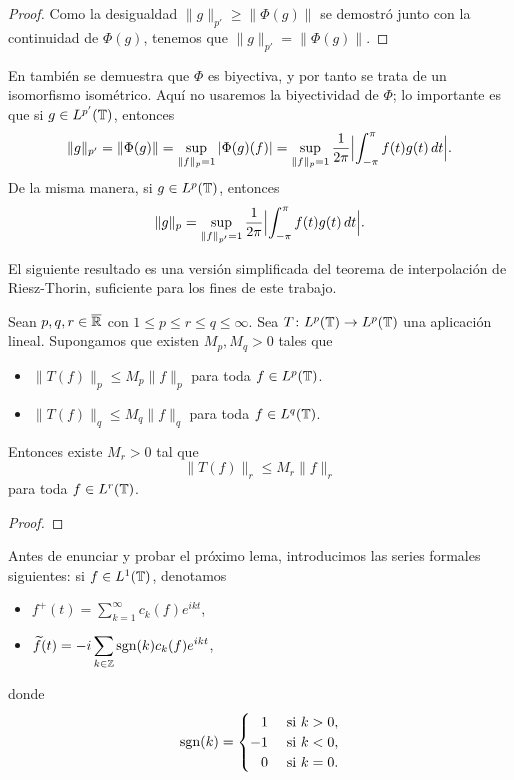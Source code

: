 \documentclass[a4paper, 12pt, oneside]{book}
\begin{document}
\begin{proof}
    Como la desigualdad $\|g\|_{p'} \geq \|\Phi(g)\|$ se demostró junto con la continuidad de $\Phi(g)$, tenemos que $\|g\|_{p'} = \|\Phi(g)\|$.
\end{proof}

En \cite{folland} también se demuestra que $\Phi$ es biyectiva, y por tanto se trata de un isomorfismo isométrico. Aquí no usaremos la biyectividad de $\Phi$; lo importante es que si $g \in L^{p'}(\mathbb T)$, entonces
\[
    \|g\|_{p'} = \|\Phi(g)\| = \sup_{\|f\|_p = 1} |\Phi(g)(f)| = \sup_{\|f\|_p=1}\frac{1}{2\pi}\Bigl|\int_{-\pi}^{\pi} f(t)g(t) \, dt\Bigr|.
\]
De la misma manera, si $g\in L^p(\mathbb T)$, entonces
\begin{equation}\label{1.3.1}
    \|g\|_{p} = \sup_{\|f\|_{p'}=1}\frac{1}{2\pi}\Bigl|\int_{-\pi}^{\pi} f(t)g(t) \, dt\Bigr|.
\end{equation}

El siguiente resultado es una versión simplificada del teorema de interpolación de Riesz-Thorin, suficiente para los fines de este trabajo.

\begin{theorem}\label{3.2.2}
    Sean $p,q,r\in\overline{\mathbb R}$ con $1 \leq p \leq r \leq q \leq \infty$. Sea $T \colon L^{p}(\mathbb T) \to L^{p}(\mathbb T)$ una aplicación lineal. Supongamos que existen $M_p,M_q>0$ tales que
    \begin{itemize}
        \item $\|T(f)\|_{p} \leq M_p\|f\|_{p}$ para toda $f \in L^{p}(\mathbb T)$.
        \item $\|T(f)\|_{q} \leq M_q\|f\|_{q}$ para toda $f \in L^{q}(\mathbb T)$.
    \end{itemize}
    Entonces existe $M_r>0$ tal que
    \[\|T(f)\|_r \leq M_r\|f\|_r\]
    para toda $f \in L^r(\mathbb T)$.
\end{theorem}

\begin{proof}
    
\end{proof}

Antes de enunciar y probar el próximo lema, introducimos las series formales siguientes: si $f\in L^1(\mathbb T)$, denotamos
\begin{itemize}
    \item $\displaystyle f^+(t) = \sum_{k=1}^\infty c_k(f)e^{ikt}$,
    \item $\displaystyle \widetilde{f}(t) = -i\sum_{k\in\mathbb Z} \textup{sgn}(k)c_k(f)e^{ikt}$,
\end{itemize}
donde
\[\sgn(k) = \begin{cases}
    \phantom{-}1 & $ si $ k > 0, \\
    -1 & $ si $ k < 0, \\
    \phantom{-}0 & $ si $ k = 0.
\end{cases}\]
\end{document}
